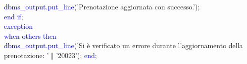 \documentclass{article}
\begin{document}
\begin{flushleft}
{        \hspace*{6em}\textcolor{blue}{dbms\_output.put\_line}('Prenotazione aggiornata con successo.'); \\
        \hspace*{4em}\textcolor{blue}{end if}; \\
        \hspace*{2em}\textcolor{blue}{exception} \\
        \hspace*{4em}\textcolor{blue}{when others then} \\
        \hspace*{6em}\textcolor{blue}{dbms\_output.put\_line}('Si è verificato un errore durante \hspace*{6em}l'aggiornamento della prenotazione: ' $\Vert$ '20023');
        \hspace*{2em}\textcolor{blue}{end}; \\}
    \end{flushleft}
\end{document}
